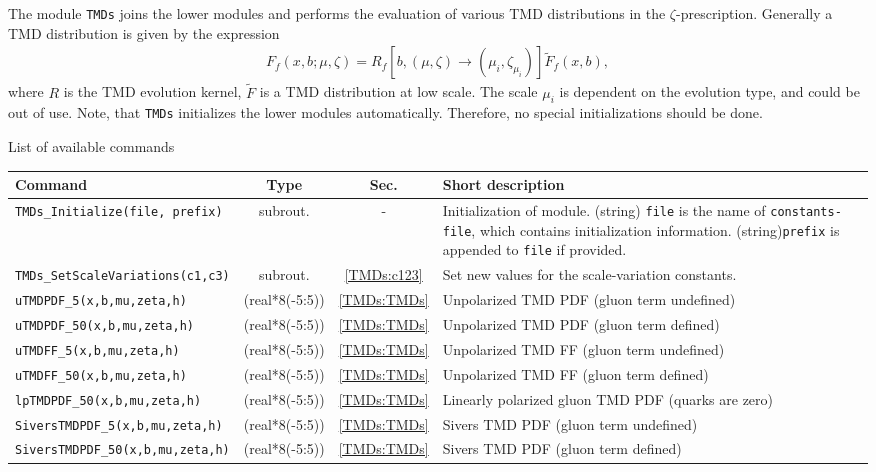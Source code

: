 \documentclass[prd,nofootinbib,eqsecnum,final]{revtex4}
\renewcommand{\(}{\left(}
\renewcommand{\)}{\right)}
\renewcommand{\[}{\left[}
\renewcommand{\]}{\right]}
\newcommand{\blue}[1]{{\color{blue} #1}}
\begin{document}
The module \texttt{TMDs} joins the lower modules and performs the evaluation of various TMD distributions in the $\zeta$-prescription. Generally a TMD distribution is given by the expression
\begin{eqnarray}
F_f(x,b;\mu,\zeta)=R_f[b,(\mu,\zeta)\to(\mu_i,\zeta_{\mu_i})]\tilde F_f(x,b),
\end{eqnarray}
where $R$ is the TMD evolution kernel, $\tilde F$ is a TMD distribution at low scale. The scale $\mu_i$ is dependent on the evolution type, and could be out of use. Note, that \texttt{TMDs} initializes the lower modules automatically. Therefore, no special initializations should be done.

\begin{center}
List of available commands
\\
\begin{tabular}{||l|c|c|p{8cm}||}
\hline\hline
Command & ~~Type~~& ~~Sec.~~ & Short description
\\\hline
\texttt{TMDs{\_}Initialize(file,\blue{prefix})} & subrout. & - & Initialization of module. (string) \texttt{file} is the name of \texttt{constants-file}, which contains initialization information. (string)\texttt{prefix} is appended to \texttt{file} if provided.
\\\hline
\texttt{TMDs\_SetScaleVariations(c1,c3)} & subrout. & \ref{TMDs:c123} & Set new values for the scale-variation constants.
\\\hline\hline
\texttt{uTMDPDF{\_}5(x,b,mu,zeta,h)} & (real*8(-5:5)) &\ref{TMDs:TMDs} & Unpolarized TMD PDF (gluon term undefined)
\\\hline
\texttt{uTMDPDF{\_}50(x,b,mu,zeta,h)} & (real*8(-5:5)) &\ref{TMDs:TMDs} & Unpolarized TMD PDF (gluon term defined)
\\\hline
\texttt{uTMDFF{\_}5(x,b,mu,zeta,h)} & (real*8(-5:5)) &\ref{TMDs:TMDs} & Unpolarized TMD FF (gluon term undefined)
\\\hline
\texttt{uTMDFF{\_}50(x,b,mu,zeta,h)} & (real*8(-5:5)) &\ref{TMDs:TMDs} & Unpolarized TMD FF (gluon term defined)
\\\hline
\texttt{lpTMDPDF{\_}50(x,b,mu,zeta,h)} & (real*8(-5:5)) &\ref{TMDs:TMDs} & Linearly polarized gluon TMD PDF (quarks are zero)
\\\hline
\texttt{SiversTMDPDF{\_}5(x,b,mu,zeta,h)} & (real*8(-5:5)) &\ref{TMDs:TMDs} & Sivers TMD PDF (gluon term undefined)
\\\hline
\texttt{SiversTMDPDF{\_}50(x,b,mu,zeta,h)} & (real*8(-5:5)) &\ref{TMDs:TMDs} & Sivers TMD PDF (gluon term defined)

\end{tabular}
\end{center}
\end{document}
